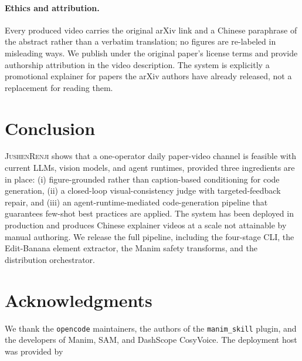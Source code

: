 \documentclass[11pt,a4paper]{article}
\begin{document}
\paragraph{Ethics and attribution.}
Every produced video carries the original arXiv link and a Chinese paraphrase of the abstract rather than a verbatim translation; no figures are re-labeled in misleading ways. We publish under the original paper's license terms and provide authorship attribution in the video description. The system is explicitly a promotional explainer for papers the arXiv authors have already released, not a replacement for reading them.

\section{Conclusion}
\label{sec:conclusion}

\textsc{JushenRenji} shows that a one-operator daily paper-video channel is feasible with current LLMs, vision models, and agent runtimes, provided three ingredients are in place: (i) figure-grounded rather than caption-based conditioning for code generation, (ii) a closed-loop visual-consistency judge with targeted-feedback repair, and (iii) an agent-runtime-mediated code-generation pipeline that guarantees few-shot best practices are applied. The system has been deployed in production and produces Chinese explainer videos at a scale not attainable by manual authoring. We release the full pipeline, including the four-stage CLI, the Edit-Banana element extractor, the Manim safety transforms, and the distribution orchestrator.

\section*{Acknowledgments}
We thank the \texttt{opencode} maintainers, the authors of the \texttt{manim\_skill} plugin, and the developers of Manim, SAM, and DashScope CosyVoice. The deployment host was provided by %


\end{document}
